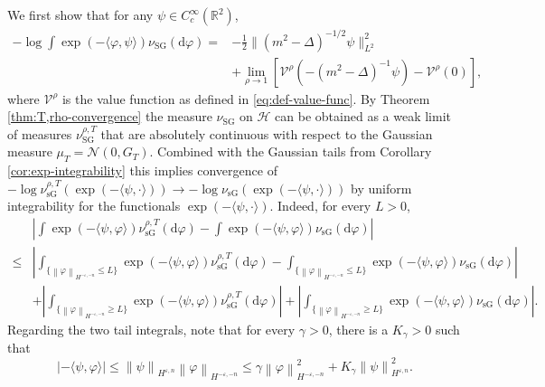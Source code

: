 \documentclass[11pt, a4paper]{scrartcl}
\numberwithin{equation}{section}
\theoremstyle{plain}
\theoremstyle{remark}
\newcommand{\mathd}{\mathrm{d}}
\newcommand{\tmop}[1]{\ensuremath{\operatorname{#1}}}
\newcommand{\tmtextbf}[1]{\text{{\bfseries{#1}}}}
\begin{document}
\tmtextbf{Step 1.} We first show that for any $\psi\in C^{\infty}_{c}(\mathbb{R}^{2})$,
\begin{equation}
	\begin{aligned}
		- \log \int \exp (- \langle \varphi, \psi \rangle) \nu_{\tmop{SG}} (\mathd
		\varphi) = & - \frac{1}{2} \| (m^2 - \Delta)^{-1 / 2} \psi \|_{L^2}^2 \\
		           & + \lim_{\rho\to 1}
		[\mathcal{V}^{\rho} (- (m^2 - \Delta)^{-1} \psi) - \mathcal{V}^{\rho} (0)],
		\label{eq:MGF-SG}
	\end{aligned}
\end{equation}
where $\mathcal{V}^{\rho}$ is the value function as defined in
\eqref{eq:def-value-func}.  By Theorem \ref{thm:T,rho-convergence} the measure
$\nu_{\tmop{SG}}$ on $\mathcal{H}$ can be obtained as a weak limit of
measures $\nu_{\tmop{SG}}^{\rho, T}$ that are absolutely continuous with
respect to the Gaussian measure $\mu_T = \mathcal{N} (0, G_T)$.
Combined with the Gaussian tails from Corollary \ref{cor:exp-integrability} this implies convergence of $-\log\nu_{\tmop{sG}}^{\rho,T}(\exp(-\langle\psi,\cdot\rangle))\to -\log \nu_{\tmop{sG}}(\exp(-\langle\psi,\cdot\rangle))$ by uniform integrability for the functionals $\exp(-\langle \psi, \cdot\rangle)$.
Indeed, for every $L>0$,
\begin{align*}
	          & \left|\int \exp(-\langle\psi, \varphi\rangle )\nu^{\rho,T}_{\tmop{sG}}(\mathd \varphi) - \int \exp(-\langle\psi, \varphi\rangle )\nu_{\tmop{sG}}(\mathd \varphi)\right| \\
	\leqslant & \left|\int_{\{\left\| \varphi \right\|_{H^{-\varepsilon, -n}}\leqslant L \}}\exp(-\langle\psi, \varphi\rangle )\nu^{\rho,T}_{\tmop{sG}}(\mathd \varphi) -
	\int_{\{\left\| \varphi \right\|_{H^{-\varepsilon, -n}}\leqslant L \}} \exp(-\langle\psi, \varphi\rangle )\nu_{\tmop{sG}}(\mathd \varphi)\right|                                    \\
	          & + \left|\int_{\{\left\| \varphi \right\|_{H^{-\varepsilon, -n}}\geq L \}} \exp(-\langle\psi, \varphi\rangle )\nu^{\rho,T}_{\tmop{sG}}(\mathd \varphi)\right|
	+ \left|\int_{\{\left\| \varphi \right\|_{H^{-\varepsilon, -n}}\geq L \}} \exp(-\langle\psi, \varphi\rangle )\nu_{\tmop{sG}}(\mathd \varphi)\right|.
\end{align*}
Regarding the two tail integrals, note that for every $\gamma>0$, there is a $K_{\gamma}>0$ such that
\[|-\langle \psi, \varphi\rangle|
	\leqslant\left\| \psi \right\|_{H^{\varepsilon,n}} \left\| \varphi \right\|_{H^{-\varepsilon, -n}}
	\leqslant \gamma\left\| \varphi \right\|^2_{H^{-\varepsilon,-n}}
	+ K_{\gamma} \left\| \psi \right\|^2_{H^{\varepsilon,n}}.
\]
\end{document}
